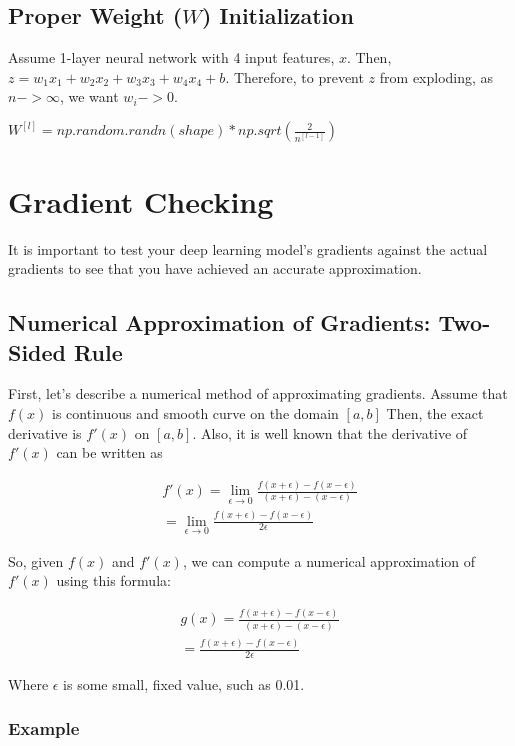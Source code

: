 \documentclass{article}
\begin{document}
\subsection{Proper Weight ($W$) Initialization}

Assume 1-layer neural network with 4 input features, $x$.  Then, $z = w_1 x_1 + w_2 x_2 + w_3 x_3 + w_4 x_4 + b$.  Therefore, to prevent $z$ from exploding, as $n -> \infty$, we want $w_i -> 0$.

$W^{[l]} = np.random.randn(shape) * np.sqrt(\frac{2}{n^{[l-1]}})$

\section{Gradient Checking}

It is important to test your deep learning model's gradients against the actual gradients to see that you have achieved an accurate approximation.

\subsection{Numerical Approximation of Gradients: Two-Sided Rule}

First, let's describe a numerical method of approximating gradients.  Assume that $f(x)$ is continuous and smooth curve on the domain $[a,b]$  Then, the exact derivative is $f'(x)$ on $[a,b]$.  Also, it is well known that the derivative of $f'(x)$ can be written as

\begin{align}
f'(x) = \lim_{\epsilon \to 0} \frac{f(x + \epsilon) - f(x - \epsilon)}{(x + \epsilon) - (x - \epsilon)} \\
= \lim_{\epsilon \to 0} \frac{f(x + \epsilon) - f(x - \epsilon)}{2 \epsilon}
\end{align}

So, given $f(x)$ and $f'(x)$, we can compute a numerical approximation of $f'(x)$ using this formula:

\begin{align}
g(x) = \frac{f(x + \epsilon) - f(x - \epsilon)}{(x + \epsilon) - (x - \epsilon)} \\
= \frac{f(x + \epsilon) - f(x - \epsilon)}{2 \epsilon}
\end{align}

Where $\epsilon$ is some small, fixed value, such as 0.01.

\subsubsection{Example}
\end{document}
